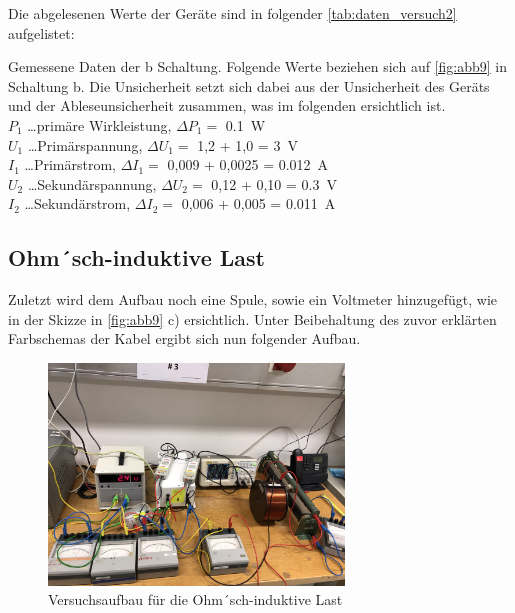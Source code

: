 \documentclass[11pt,ngerman]{scrartcl}
\begin{document}
Die abgelesenen Werte der Geräte sind in folgender \autoref{tab:daten_versuch2} aufgelistet:

\begin{table}[H]
	\caption{Gemessene Daten der b Schaltung. Folgende Werte beziehen sich auf \autoref{fig:abb9} in Schaltung b. Die Unsicherheit setzt sich dabei aus der Unsicherheit des Geräts und der Ableseunsicherheit zusammen, was im folgenden ersichtlich ist.\\
		$P_1$ \dots primäre Wirkleistung, $\Delta P_1 =$ \SI{0.1}{W}\\
		$U_1$ \dots  Primärspannung, $\Delta U_1 =$ 1,2 + 1,0 = \SI{3}{V} \\
		$I_1$ \dots Primärstrom, $\Delta I_1 =$ 0,009 + 0,0025 = \SI{0.012}{A} \\
		$U_2$ \dots Sekundärspannung, $\Delta U_2 =$ 0,12 + 0,10 = \SI{0.3}{V}  \\
		$I_2$ \dots Sekundärstrom, $\Delta I_2 =$ 0,006 + 0,005 = \SI{0.011}{A} \\
	}
	\label{tab:daten_versuch2}
	\begin{center}
		
	\end{center}
\end{table}


\subsection{Ohm´sch-induktive Last}

Zuletzt wird dem Aufbau noch eine Spule, sowie ein Voltmeter hinzugefügt, wie in der Skizze in \autoref{fig:abb9} c) ersichtlich. Unter Beibehaltung des zuvor erklärten Farbschemas der Kabel ergibt sich nun folgender Aufbau.

\begin{figure}[H]
	\begin{center}
		\includegraphics[width=0.7\textwidth]{spule}
	\end{center}
	\caption{Versuchsaufbau für die Ohm´sch-induktive Last}
	\label{fig:spule}
\end{figure}
\end{document}
